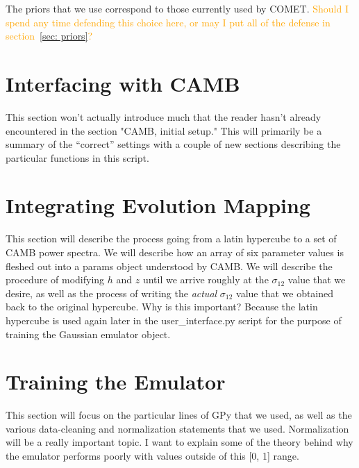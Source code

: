 
The priors that we use correspond to those currently used by COMET. \textcolor{orange}{Should I spend any time defending this choice here, or may I put all of the defense in section~\ref{sec: priors}?}

\section{Interfacing with CAMB}


This section won't actually introduce much that the reader hasn't already encountered in the section "CAMB, initial setup." This will primarily be a summary of the ``correct'' settings with a couple of new sections describing the particular functions in this script.

\section{Integrating Evolution Mapping}


This section will describe the process going from a latin hypercube to a set of CAMB power spectra. We will describe how an array of six parameter values is fleshed out into a params object understood by CAMB. We will describe the procedure of modifying $h$ and $z$ until we arrive roughly at the $\sigma_{12}$ value that we desire, as well as the process of writing the \textit{actual} $\sigma_{12}$ value that we obtained back to the original hypercube. Why is this important? Because the latin hypercube is used again later in the user\_interface.py script for the purpose of training the Gaussian emulator object.

\section{Training the Emulator}
\label{sec: emu_training}


This section will focus on the particular lines of GPy that we used, as well
as the various data-cleaning and normalization statements that we used.
Normalization will be a really important topic. I want to explain some of
the theory behind why the emulator performs poorly with values outside of this
[0, 1] range.


